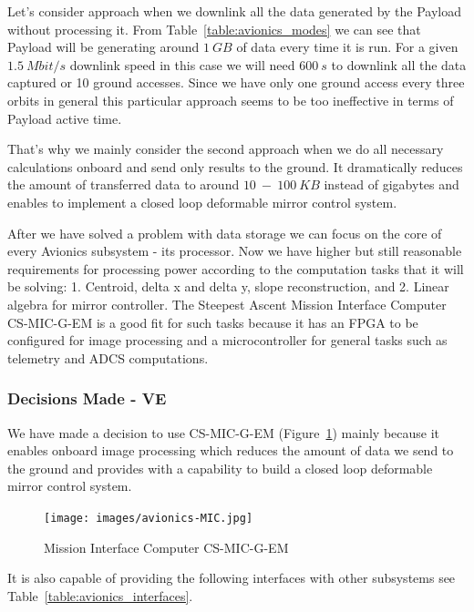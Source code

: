 \documentclass[12pt]{article}
\begin{document}
Let’s consider approach when we downlink all the data generated by the Payload without processing it. From Table~\ref{table:avionics_modes} we can see that Payload will be generating around $1\ GB$ of data every time it is run. For a given $1.5\ Mbit/s$ downlink speed in this case we will need $600\ s$ to downlink all the data captured or 10 ground accesses. Since we have only one ground access every three orbits in general this particular approach seems to be too ineffective in terms of Payload active time. 

That’s why we mainly consider the second approach when we do all necessary calculations onboard and send only results to the ground. It dramatically reduces the amount of transferred data to around $10\ -\ 100\ KB$ instead of gigabytes and enables to implement a closed loop deformable mirror control system.

After we have solved a problem with data storage we can focus on the core of every Avionics subsystem - its processor. Now we have higher but still reasonable requirements for processing power according to the computation tasks that it will be solving: 1. Centroid, delta x and delta y, slope reconstruction, and 2. Linear algebra for mirror controller.
The Steepest Ascent Mission Interface Computer CS-MIC-G-EM is a good fit for such tasks because it has an FPGA to be configured for image processing and a microcontroller for general tasks such as telemetry and ADCS computations.

\subsubsection{Decisions Made - VE}

We have made a decision to use CS-MIC-G-EM (Figure~\ref{fig:avionics_MIC}) mainly because it enables onboard image processing which reduces the amount of data we send to the ground and provides with a capability to build a closed loop deformable mirror control system.

\begin{figure}[ht]
\centering
  \texttt{[image: images/avionics-MIC.jpg]}
\caption{Mission Interface Computer CS-MIC-G-EM \cite{avionics_clyde_space}}
\label{fig:avionics_MIC}
\end{figure}

It is also capable of providing the following interfaces with other subsystems see Table~\ref{table:avionics_interfaces}.
\end{document}
